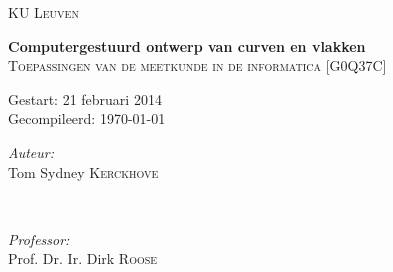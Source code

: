 \begin{titlepage}
\thispagestyle{empty}
\newcommand{\HRule}{\rule{\linewidth}{0.5mm}}
\center
\textsc{\LARGE KU Leuven}\\[1.5cm]
\vfill


{ \Huge \bfseries Computergestuurd ontwerp van curven en vlakken}\\[0.4cm]
\textsc{\large Toepassingen van de meetkunde in de informatica [G0Q37C]}\\[0.5cm]

\vspace{5cm}

\begin{Large}
Gestart: 21 februari 2014\\
Gecompileerd: \today\\
\end{Large}
\vspace{5cm}

\begin{minipage}{0.4\textwidth}
\begin{flushleft} \large
\emph{Auteur:}\\
Tom Sydney \textsc{Kerckhove}
\end{flushleft}
\end{minipage}
~
\begin{minipage}{0.4\textwidth}
\begin{flushright} \large
\emph{Professor:} \\
Prof. Dr. Ir. Dirk \textsc{Roose}\\
\end{flushright}
\end{minipage}\\[4cm]

\vfill

\end{titlepage}
